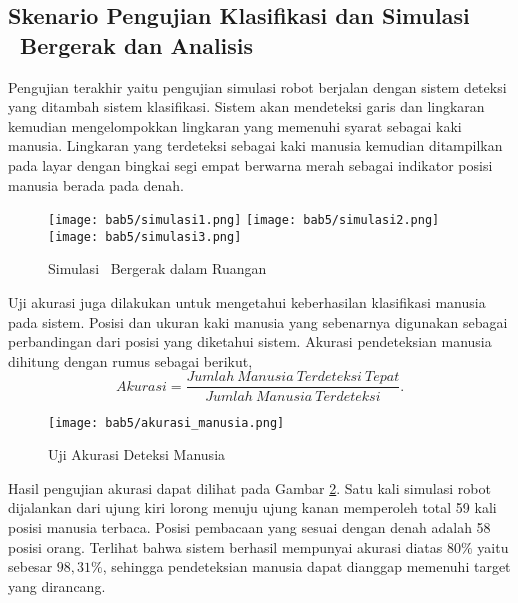 \subsection{Skenario Pengujian Klasifikasi dan Simulasi \lidar\ Bergerak dan Analisis}
\label{subsec:Skenario4}
Pengujian terakhir yaitu pengujian simulasi robot berjalan dengan sistem deteksi yang ditambah sistem klasifikasi. Sistem akan mendeteksi garis dan lingkaran kemudian mengelompokkan lingkaran yang memenuhi syarat sebagai kaki manusia. Lingkaran yang terdeteksi sebagai kaki manusia kemudian ditampilkan pada layar dengan bingkai  segi empat berwarna merah sebagai indikator posisi manusia berada pada denah. 
\begin{figure}[H]
    \centering
    \texttt{[image: bab5/simulasi1.png]}
    \texttt{[image: bab5/simulasi2.png]}
    \texttt{[image: bab5/simulasi3.png]}
    \caption{Simulasi \lidar\ Bergerak dalam Ruangan}
        \label{fig:Ch05_simulasi}
\end{figure}
Uji akurasi juga dilakukan untuk mengetahui keberhasilan klasifikasi manusia pada sistem. Posisi dan ukuran kaki manusia yang sebenarnya digunakan sebagai perbandingan dari posisi yang diketahui sistem. Akurasi pendeteksian manusia dihitung dengan rumus sebagai berikut,
\begin{equation}
    Akurasi=\frac{Jumlah\ Manusia\ Terdeteksi\ Tepat}{Jumlah\ Manusia\ Terdeteksi}.
\end{equation}
\begin{figure}[H]
    \centering
    \texttt{[image: bab5/akurasi\_manusia.png]}
    \caption{Uji Akurasi Deteksi Manusia}
        \label{fig:Ch05_akurasi_manusia}
\end{figure}
Hasil pengujian akurasi dapat dilihat pada Gambar \ref*{fig:Ch05_akurasi_manusia}. Satu kali simulasi robot dijalankan dari ujung kiri lorong menuju ujung kanan memperoleh total 59 kali posisi manusia terbaca. Posisi pembacaan yang sesuai dengan denah adalah 58 posisi orang. Terlihat bahwa sistem berhasil mempunyai akurasi diatas $80\%$ yaitu sebesar $98,31\%$, sehingga pendeteksian manusia dapat dianggap memenuhi target yang dirancang.


